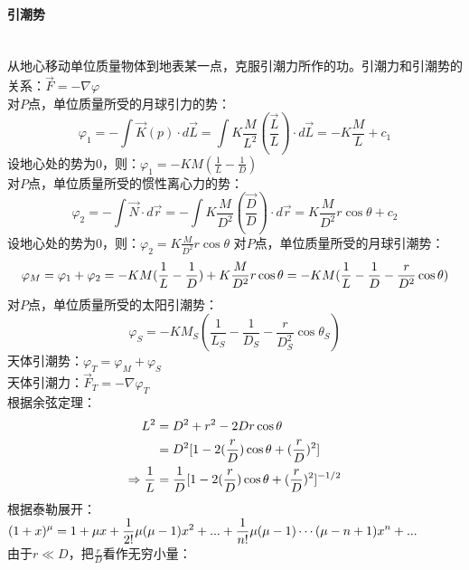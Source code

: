 \documentclass[a4paper,12pt]{article}
\begin{document}
    \paragraph{引潮势}~{}\\
    从地心移动单位质量物体到地表某一点，克服引潮力所作的功。引潮力和引潮势的关系：$\vec{F}=-\nabla \varphi$\\
    对$P$点，单位质量所受的月球引力的势：
    \[
        \varphi_{1}=-\int \vec{K}(p) \cdot d \vec{L}=\int K \frac{M}{L^{2}}\left(\frac{\vec{L}}{L}\right) \cdot d \vec{L}=-K \frac{M}{L}+c_{1}
    \]
    设地心处的势为0，则：$\displaystyle \varphi_{1}=-K M\left(\frac{1}{L}-\frac{1}{D}\right)$\\
    对$P$点，单位质量所受的惯性离心力的势：
    \[
        \varphi_{2}=-\int \vec{N} \cdot d \vec{r}=-\int K \frac{M}{D^{2}}\left(\frac{\vec{D}}{D}\right) \cdot d \vec{r}=K \frac{M}{D^{2}} r \cos \theta+c_{2}
    \]
    设地心处的势为0，则：$\displaystyle \varphi_{2}=K \frac{M}{D^{2}} r \cos \theta$
    对$P$点，单位质量所受的月球引潮势：
    \[
        {\varphi _M} = {\varphi _1} + {\varphi _2} =  - K{M}({1 \over L} - {1 \over D}) + K{{{M}} \over {{D^2}}}r\cos \theta  =  - K{M}({1 \over L} - {1 \over D} - {r \over {{D^2}}}\cos \theta )
    \]
    对$P$点，单位质量所受的太阳引潮势：
    \[
        \varphi_{S}=-K M_{S}\left(\frac{1}{L_{S}}-\frac{1}{D_{S}}-\frac{r}{D_{S}^{2}} \cos \theta_{S}\right)
    \]
    天体引潮势：$\displaystyle \varphi_T=\varphi_M+\varphi_S$\\
    天体引潮力：$\displaystyle \vec{F}_T=-\nabla\varphi_T$\\
    根据余弦定理：
    \[
        \begin{aligned}
           {L^2} &= {D^2} + {r^2} - 2Dr\cos \theta  \\
           &=  {D^2}[1 - 2({r \over D})\cos \theta  + {({r \over D})^2}]\\
            \Rightarrow {1 \over L} &= {1 \over D}{[1 - 2({r \over D})\cos \theta  + {({r \over D})^2}]^{ - 1/2}}
        \end{aligned}
    \]
    根据泰勒展开：$\displaystyle {(1 + x)^\mu } = 1 + \mu x + {1 \over {2!}}\mu (\mu  - 1){x^2} + ... + {1 \over {n!}}\mu (\mu  - 1)\cdots (\mu  - n + 1){x^n} + ...$\\
    由于$r\ll D$，把$\displaystyle \frac{r}{D}$看作无穷小量：
\end{document}
